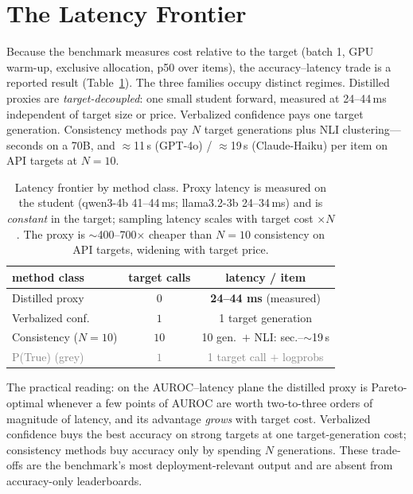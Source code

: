 \documentclass[11pt]{article}
\newcommand{\grey}[1]{\textcolor{gray}{#1}}
\begin{document}
\section{The Latency Frontier}\label{sec:latency}
Because the benchmark measures cost relative to the target (batch 1, GPU warm-up,
exclusive allocation, p50 over items), the accuracy--latency trade is a reported result
(Table~\ref{tab:latency}). The three families occupy distinct regimes. Distilled proxies
are \emph{target-decoupled}: one small student forward, measured at 24--44\,ms
independent of target size or price. Verbalized confidence pays one target generation.
Consistency methods pay $N$ target generations plus NLI clustering---seconds on a 70B, and
$\approx$11\,s (GPT-4o) / $\approx$19\,s (Claude-Haiku) per item on API targets at
$N{=}10$.

\begin{table}[t]\centering\small
\setlength{\tabcolsep}{4pt}
\begin{tabular}{l c c}
\toprule
method class & target calls & latency / item\\
\midrule
Distilled proxy   & $0$ & \textbf{24--44 ms} (measured)\\
Verbalized conf.  & $1$ & 1 target generation\\
Consistency ($N{=}10$) & $10$ & 10 gen.\ $+$ NLI: sec.--$\sim$19\,s\\
\grey{P(True) (grey)} & \grey{$1$} & \grey{1 target call $+$ logprobs}\\
\bottomrule
\end{tabular}
\caption{Latency frontier by method class. Proxy latency is measured on the student
(qwen3-4b 41--44\,ms; llama3.2-3b 24--34\,ms) and is \emph{constant} in the target;
sampling latency scales with target cost $\times N$. The proxy is $\sim$400--700$\times$
cheaper than $N{=}10$ consistency on API targets, widening with target price.}
\label{tab:latency}
\end{table}

The practical reading: on the AUROC--latency plane the distilled proxy is Pareto-optimal
whenever a few points of AUROC are worth two-to-three orders of magnitude of latency, and
its advantage \emph{grows} with target cost. Verbalized confidence buys the best
accuracy on strong targets at one target-generation cost; consistency methods buy
accuracy only by spending $N$ generations. These trade-offs are the benchmark's most
deployment-relevant output and are absent from accuracy-only leaderboards.
\end{document}
